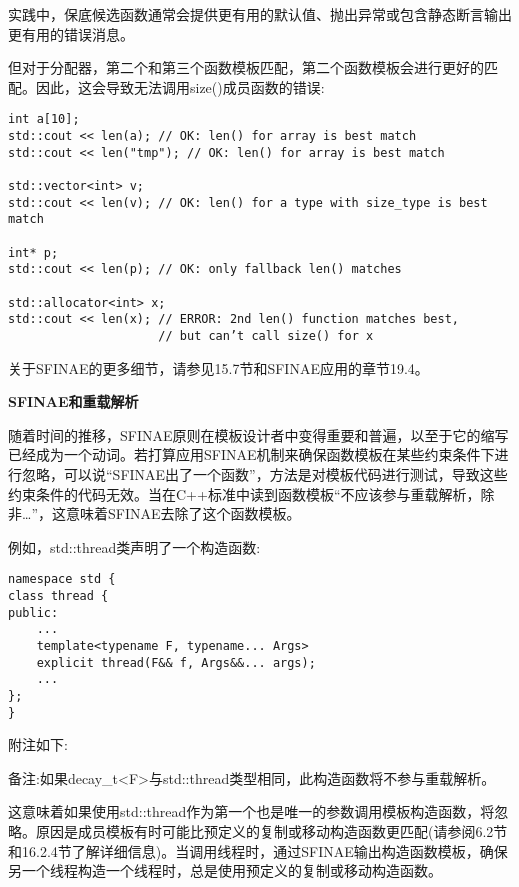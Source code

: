 \begin{tcolorbox}[colback=webgreen!5!white,colframe=webgreen!75!black]
\hspace*{0.75cm}实践中，保底候选函数通常会提供更有用的默认值、抛出异常或包含静态断言输出更有用的错误消息。
\end{tcolorbox}

但对于分配器，第二个和第三个函数模板匹配，第二个函数模板会进行更好的匹配。因此，这会导致无法调用size()成员函数的错误:

\begin{lstlisting}[style=styleCXX]
int a[10];
std::cout << len(a); // OK: len() for array is best match
std::cout << len("tmp"); // OK: len() for array is best match

std::vector<int> v;
std::cout << len(v); // OK: len() for a type with size_type is best match

int* p;
std::cout << len(p); // OK: only fallback len() matches

std::allocator<int> x;
std::cout << len(x); // ERROR: 2nd len() function matches best,
					 // but can’t call size() for x
\end{lstlisting}

关于SFINAE的更多细节，请参见15.7节和SFINAE应用的章节19.4。

\noindent
\textbf{SFINAE和重载解析}

随着时间的推移，SFINAE原则在模板设计者中变得重要和普遍，以至于它的缩写已经成为一个动词。若打算应用SFINAE机制来确保函数模板在某些约束条件下进行忽略，可以说“SFINAE出了一个函数”，方法是对模板代码进行测试，导致这些约束条件的代码无效。当在C++标准中读到函数模板“不应该参与重载解析，除非…”，这意味着SFINAE去除了这个函数模板。

例如，std::thread类声明了一个构造函数:

\begin{lstlisting}[style=styleCXX]
namespace std {
class thread {
public:
	...
	template<typename F, typename... Args>
	explicit thread(F&& f, Args&&... args);
	...
};
}
\end{lstlisting}

附注如下:

备注:如果decay\_t<F>与std::thread类型相同，此构造函数将不参与重载解析。

这意味着如果使用std::thread作为第一个也是唯一的参数调用模板构造函数，将忽略。原因是成员模板有时可能比预定义的复制或移动构造函数更匹配(请参阅6.2节和16.2.4节了解详细信息)。当调用线程时，通过SFINAE输出构造函数模板，确保另一个线程构造一个线程时，总是使用预定义的复制或移动构造函数。

